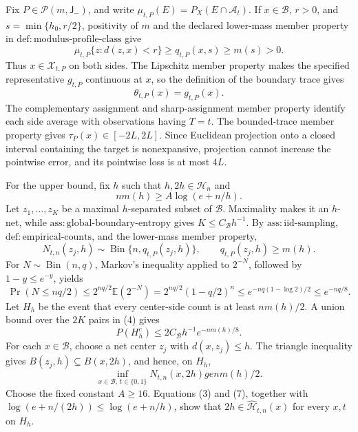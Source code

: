 Fix \(P\in\mathcal P(m,\mathsf J_{-})\), and write \(\mu_{t,P}(E)=P_X(E\cap\mathcal A_t)\).  If \(x\in\mathcal B\), \(r>0\), and \(s=\min\{h_0,r/2\}\), positivity of \(m\) and the declared lower-mass member property in \(\mathrm{def:modulus\text{-}profile\text{-}class}\) give
\[
 \mu_{t,P}\{z:d(z,x)<r\}\ge q_{t,P}(x,s)\ge m(s)>0. \tag{1}
\]
Thus \(x\in\mathcal X_{t,P}\) on both sides.  The Lipschitz member property makes the specified representative \(g_{t,P}\) continuous at \(x\), so the definition of the boundary trace gives
\[
 \theta_{t,P}(x)=g_{t,P}(x). \tag{2}
\]
The complementary assignment and sharp-assignment member property identify each side average with observations having \(T=t\).  The bounded-trace member property gives \(\tau_P(x)\in[-2L,2L]\).  Since Euclidean projection onto a closed interval containing the target is nonexpansive, projection cannot increase the pointwise error, and its pointwise loss is at most \(4L\).

For the upper bound, fix \(h\) such that \(h,2h\in\mathcal H_n\) and
\[
 nm(h)\ge A\log(e+n/h). \tag{3}
\]
Let \(z_1,\ldots,z_K\) be a maximal \(h\)-separated subset of \(\mathcal B\).  Maximality makes it an \(h\)-net, while \(\mathrm{ass:global\text{-}boundary\text{-}entropy}\) gives \(K\le C_{\mathcal B}h^{-1}\).  By \(\mathrm{ass:iid\text{-}sampling}\), \(\mathrm{def:empirical\text{-}counts}\), and the lower-mass member property,
\[
 N_{t,n}(z_j,h)\sim\operatorname{Bin}\{n,q_{t,P}(z_j,h)\},
 \qquad q_{t,P}(z_j,h)\ge m(h). \tag{4}
\]
For \(N\sim\operatorname{Bin}(n,q)\), Markov's inequality applied to \(2^{-N}\), followed by \(1-y\le e^{-y}\), yields
\[
 \Pr(N\le nq/2)
 \le 2^{nq/2}\mathbb E(2^{-N})
 =2^{nq/2}(1-q/2)^n
 \le e^{-nq(1-\log 2)/2}
 \le e^{-nq/8}. \tag{5}
\]
Let \(H_h\) be the event that every center-side count is at least \(nm(h)/2\).  A union bound over the \(2K\) pairs in (4) gives
\[
 P(H_h^c)\le2C_{\mathcal B}h^{-1}e^{-nm(h)/8}. \tag{6}
\]
For each \(x\in\mathcal B\), choose a net center \(z_j\) with \(d(x,z_j)\le h\).  The triangle inequality gives \(B(z_j,h)\subseteq B(x,2h)\), and hence, on \(H_h\),
\[
 \inf_{x\in\mathcal B,\,t\in\{0,1\}}N_{t,n}(x,2h)ge nm(h)/2. \tag{7}
\]
Choose the fixed constant \(A\ge16\).  Equations (3) and (7), together with \(\log(e+n/(2h))\le\log(e+n/h)\), show that \(2h\in\widehat{\mathcal H}_{t,n}(x)\) for every \(x,t\) on \(H_h\).

